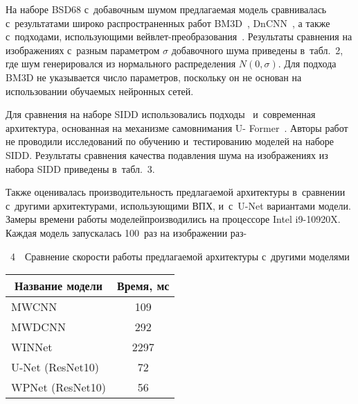 \begin{multicols}{2}

На наборе BSD68 с~добавочным шумом предлагаемая модель сравнивалась 
с~результатами широко распространенных работ BM3D~\cite{BM3D}, DnCNN~\cite{DnCNN}, 
а также с~подходами, использующими вейв\-лет-пре\-обра\-зо\-ва\-ния~\cite{MWCNN, MDIWT, 
WINNet}. Результаты сравнения на изображениях с~разным параметром $\sigma$ 
добавочного шума приведены в~табл.~2, где шум 
генерировался из нормального распределения $\mathit{N}(0, \sigma)$. Для подхода 
BM3D не указывается число параметров, поскольку он не основан на использовании 
обучаемых нейронных сетей.



Для сравнения на наборе SIDD использовались подходы~\cite{BM3D, DnCNN} 
и~современная архитектура, основанная на механизме самовнимания U-
Former~\cite{UFORMER}. Авторы работ~\cite{MWCNN, MDIWT, WINNet} не проводили 
исследований по обучению и~тестированию
моделей на наборе SIDD. Результаты сравнения качества подавления шума на 
изображениях из набора SIDD приведены в~табл.~3.



Также оценивалась производительность предлагаемой архитектуры в~сравнении 
с~другими архитектурами, использующими ВПХ, и~с~U-Net вариантами модели. Замеры 
времени работы моделей\linebreak производились на процессоре Intel i9-10920X. Каж\-дая 
модель запускалась 100~раз на изображении раз-\linebreak\vspace*{-12pt}



\begin{center}
\parbox{58mm}{{{\tablename~4}\ \ \small{Сравнение скорости работы предлагаемой архитектуры с~другими моделями
}}

}

\label{tab:time_comparison}
\vspace*{2ex}

{\small 
\tabcolsep=12pt
\begin{tabular}{ |l|c|}
\hline
\multicolumn{1}{|c|}{Название модели} & Время, мс \\
\hline
{MWCNN~\cite{MWCNN}} & 109\\
{MWDCNN~\cite{MDIWT}} & 292\\
{WINNet~\cite{WINNet}} & 2297\hphantom{9}\\ 
U-Net (ResNet10) & 72\\
WPNet (ResNet10)& 56\\
\hline
\end{tabular}
}
\end{center}


\end{multicols}

